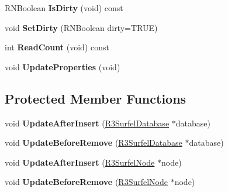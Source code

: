\begin{DoxyCompactItemize}
\item 
R\+N\+Boolean {\bfseries Is\+Dirty} (void) const \hypertarget{class_r3_surfel_block_afc28c808d80e57830dccbba9c7618045}{}\label{class_r3_surfel_block_afc28c808d80e57830dccbba9c7618045}

\item 
void {\bfseries Set\+Dirty} (R\+N\+Boolean dirty=T\+R\+UE)\hypertarget{class_r3_surfel_block_afe603aa2f7d03e3e2a238073afafe3cf}{}\label{class_r3_surfel_block_afe603aa2f7d03e3e2a238073afafe3cf}

\item 
int {\bfseries Read\+Count} (void) const \hypertarget{class_r3_surfel_block_a46f9669d63791660bf215e6b095195ef}{}\label{class_r3_surfel_block_a46f9669d63791660bf215e6b095195ef}

\item 
void {\bfseries Update\+Properties} (void)\hypertarget{class_r3_surfel_block_ac1cf69bddff74d4770744eb7935f3ef8}{}\label{class_r3_surfel_block_ac1cf69bddff74d4770744eb7935f3ef8}

\end{DoxyCompactItemize}
\subsection*{Protected Member Functions}
\begin{DoxyCompactItemize}
\item 
void {\bfseries Update\+After\+Insert} (\hyperlink{class_r3_surfel_database}{R3\+Surfel\+Database} $\ast$database)\hypertarget{class_r3_surfel_block_a6a7cd565beeca3e02578a0727021c7f8}{}\label{class_r3_surfel_block_a6a7cd565beeca3e02578a0727021c7f8}

\item 
void {\bfseries Update\+Before\+Remove} (\hyperlink{class_r3_surfel_database}{R3\+Surfel\+Database} $\ast$database)\hypertarget{class_r3_surfel_block_ac9888f80d73b53d00b181f15a838ad78}{}\label{class_r3_surfel_block_ac9888f80d73b53d00b181f15a838ad78}

\item 
void {\bfseries Update\+After\+Insert} (\hyperlink{class_r3_surfel_node}{R3\+Surfel\+Node} $\ast$node)\hypertarget{class_r3_surfel_block_a15cdcea3c1a8ede1d7eb1bcfe129dcb8}{}\label{class_r3_surfel_block_a15cdcea3c1a8ede1d7eb1bcfe129dcb8}

\item 
void {\bfseries Update\+Before\+Remove} (\hyperlink{class_r3_surfel_node}{R3\+Surfel\+Node} $\ast$node)\hypertarget{class_r3_surfel_block_ac95b4ae0b7a6325032a8c854a8bab3d4}{}\label{class_r3_surfel_block_ac95b4ae0b7a6325032a8c854a8bab3d4}

\end{DoxyCompactItemize}
